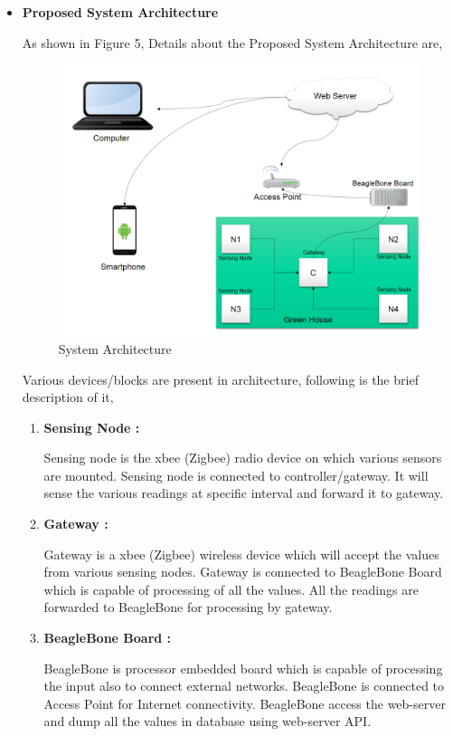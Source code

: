 \documentclass[10pt,a4paper]{article}
\begin{document}
\begin{itemize}
\item \textbf{ Proposed System Architecture}

\quad
  As shown in Figure 5, Details about the Proposed System Architecture are,

\begin{figure}[htbp]
\centering
\includegraphics[scale=0.3]{s1.png}
\caption{System Architecture}
\end{figure}

Various devices/blocks are present in architecture, following is the brief description of it,

\begin{enumerate}
\item \textbf{Sensing Node : }  

\quad
Sensing node is the xbee (Zigbee) radio device on which various sensors are mounted. Sensing node is connected to controller/gateway. It will sense the various readings at specific interval and forward it to gateway.\cite{5}

\item \textbf{Gateway : }

\quad
Gateway is a xbee (Zigbee) wireless device which will accept the values from various sensing nodes. Gateway is connected to BeagleBone Board which is capable of processing of all the values. All the readings are forwarded to BeagleBone for processing by gateway.


\item \textbf{BeagleBone Board : }

\quad
BeagleBone is processor embedded board which is capable of processing the input also to connect external networks. BeagleBone is connected to Access Point for Internet connectivity. BeagleBone access the web-server and dump all the values in database using web-server API.\cite{5}



\end{enumerate}
\end{itemize}
\end{document}
